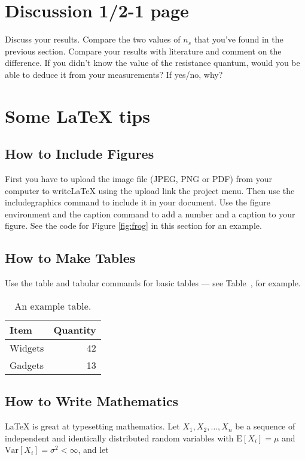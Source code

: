 \documentclass[a4paper,12pt]{article}
\begin{document}
\section{Discussion 1/2-1 page}
Discuss your results. Compare the two values of $n_{s}$ that you've found in the previous section. Compare your results with literature and comment on the difference. If you didn't know the value of the resistance quantum, would you be able to deduce it from your measurements? If yes/no, why?

\newpage
\section{Some LaTeX tips}
\label{sec:latex}
\subsection{How to Include Figures}

First you have to upload the image file (JPEG, PNG or PDF) from your computer to writeLaTeX using the upload link the project menu. Then use the includegraphics command to include it in your document. Use the figure environment and the caption command to add a number and a caption to your figure. See the code for Figure \ref{fig:frog} in this section for an example.


\subsection{How to Make Tables}

Use the table and tabular commands for basic tables --- see Table~, for example.

\begin{table}
\centering
\begin{tabular}{l|r}
Item & Quantity \\\hline
Widgets & 42 \\
Gadgets & 13
\end{tabular}
\caption{\label{tab:widgets}An example table.}
\end{table}

\subsection{How to Write Mathematics}
\LaTeX{} is great at typesetting mathematics. Let $X_1, X_2, \ldots, X_n$ be a sequence of independent and identically distributed random variables with $\text{E}[X_i] = \mu$ and $\text{Var}[X_i] = \sigma^2 < \infty$, and let
\end{document}
